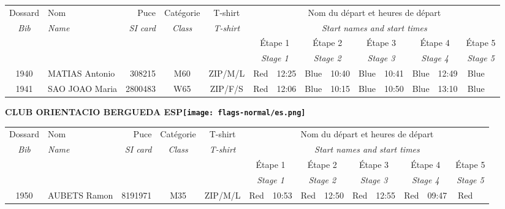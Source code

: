 \documentclass{report}
\begin{document}
  \begin{longtable}{|c|l|r|c|c|*{5}{cc|}}
    Dossard & Nom  & Puce    & Catégorie & T-shirt & \multicolumn{10}{c|}{Nom du départ et heures de départ} \\
    \itshape Bib     & \itshape Name & \itshape SI card & \itshape Class  & \itshape  T-shirt  & \multicolumn{10}{c|}{\itshape Start names and start times} \\
    \hline
    & & & & & \multicolumn{2}{c|}{Étape 1} & \multicolumn{2}{c|}{Étape 2} & \multicolumn{2}{c|}{Étape 3} & \multicolumn{2}{c|}{Étape 4} & \multicolumn{2}{c|}{Étape 5} \\
    & & & & & \multicolumn{2}{c|}{\itshape Stage 1} & \multicolumn{2}{c|}{\itshape Stage 2} & \multicolumn{2}{c|}{\itshape Stage 3} & \multicolumn{2}{c|}{\itshape Stage 4} & \multicolumn{2}{c|}{\itshape Stage 5} \\
    \hline
    1940 & MATIAS Antonio & 308215 & M60 & ZIP/M/L & Red & 12:25 & Blue & 10:40 & Blue & 10:41 & Blue & 12:49 & Blue &  \\
    1941 & SAO JOAO Maria & 2800483 & W65 & ZIP/F/S & Red & 12:06 & Blue & 10:15 & Blue & 10:50 & Blue & 13:10 & Blue &  \\
  \end{longtable}
\newpage
  \Huge \centering \bfseries CLUB ORIENTACIO BERGUEDA  ESP\normalfont \footnotesize \sffamily \hfill \texttt{[image: flags-normal/es.png]} \newline 
  \begin{longtable}{|c|l|r|c|c|*{5}{cc|}}
    Dossard & Nom  & Puce    & Catégorie & T-shirt & \multicolumn{10}{c|}{Nom du départ et heures de départ} \\
    \itshape Bib     & \itshape Name & \itshape SI card & \itshape Class  & \itshape  T-shirt  & \multicolumn{10}{c|}{\itshape Start names and start times} \\
    \hline
    & & & & & \multicolumn{2}{c|}{Étape 1} & \multicolumn{2}{c|}{Étape 2} & \multicolumn{2}{c|}{Étape 3} & \multicolumn{2}{c|}{Étape 4} & \multicolumn{2}{c|}{Étape 5} \\
    & & & & & \multicolumn{2}{c|}{\itshape Stage 1} & \multicolumn{2}{c|}{\itshape Stage 2} & \multicolumn{2}{c|}{\itshape Stage 3} & \multicolumn{2}{c|}{\itshape Stage 4} & \multicolumn{2}{c|}{\itshape Stage 5} \\
    \hline
    1950 & AUBETS Ramon & 8191971 & M35 & ZIP/M/L & Red & 10:53 & Red & 12:50 & Red & 12:55 & Red & 09:47 & Red &  \\
  \end{longtable}
\end{document}
